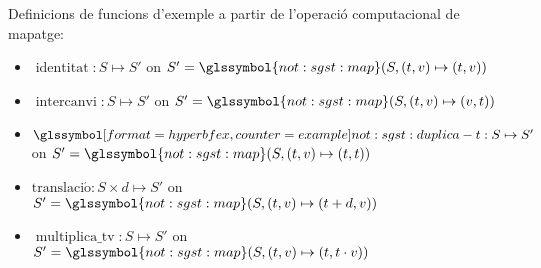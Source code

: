 \begin{example}
  Definicions de funcions d'exemple a partir de l'operació
  computacional de mapatge:

\begin{itemize}
\item $\operatorname{identitat}: S \mapsto S'$ on $S'=
  \glssymbol{not:sgst:map}(S,(t,v)\mapsto(t,v))$
\item $\operatorname{intercanvi}: S \mapsto S'$ on $S'=
  \glssymbol{not:sgst:map}(S,(t,v)\mapsto(v,t))$
\item $\glssymbolex{not:sgst:duplica-t}: S \mapsto S'$ on $S'=
  \glssymbol{not:sgst:map}(S,(t,v)\mapsto(t,t))$
\item $\operatorname{translaci\acute{o}}: S \times d \mapsto S'$ on $S'=
  \glssymbol{not:sgst:map}(S,(t,v)\mapsto(t+d,v))$
\item $\operatorname{multiplica\_tv}: S \mapsto S'$ on $S'=
  \glssymbol{not:sgst:map}(S,(t,v)\mapsto(t,t\cdot v))$


\end{itemize}
\end{example}

